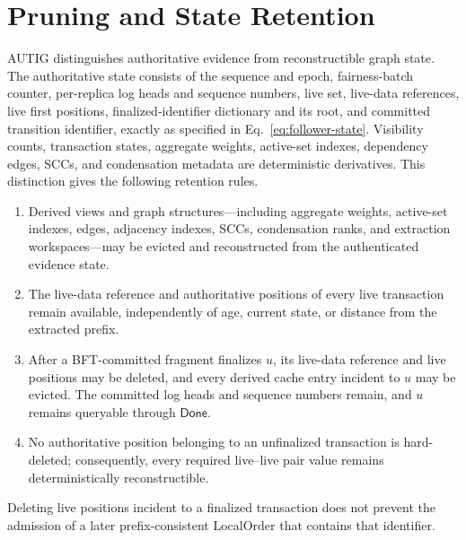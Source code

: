 \section{Pruning and State Retention}
\label{app:pruning-retention}

AUTIG distinguishes authoritative evidence from reconstructible graph state.
The authoritative state consists of the sequence and epoch, fairness-batch
counter, per-replica log heads and sequence numbers, live set, live-data
references, live first positions, finalized-identifier dictionary and its
root, and committed transition identifier, exactly as specified in
Eq.~\eqref{eq:follower-state}.
Visibility counts, transaction
states, aggregate weights, active-set indexes, dependency edges, SCCs, and
condensation metadata are deterministic derivatives.  This distinction gives
the following retention rules.

\begin{enumerate}
  \item Derived views and graph structures---including aggregate weights,
        active-set indexes, edges, adjacency indexes, SCCs, condensation
        ranks, and extraction workspaces---may be evicted and reconstructed
        from the authenticated evidence state.
  \item The live-data reference and authoritative positions of every live
        transaction remain available, independently of age, current state, or
        distance from the extracted prefix.
  \item After a BFT-committed fragment finalizes $u$, its live-data reference
        and live positions may be deleted, and every derived cache entry
        incident to $u$ may be evicted.  The committed log heads and sequence
        numbers remain, and $u$ remains queryable through $\mathsf{Done}$.
  \item No authoritative position belonging to an unfinalized transaction is
        hard-deleted; consequently, every required live--live pair value
        remains deterministically reconstructible.
\end{enumerate}

\begin{lemma}
\label{lem:delayed-extension-compatibility}
Deleting live positions incident to a finalized transaction does not prevent
the admission of a later prefix-consistent LocalOrder that contains that
identifier.
\end{lemma}

